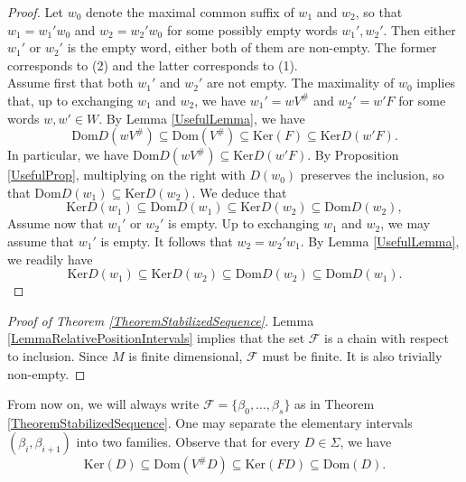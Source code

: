 \documentclass[12pt]{amsart}
\theoremstyle{definition}
\newcommand{\<}{\langle}   %
\renewcommand{\>}{\rangle} %
\begin{document}
\begin{proof}
    Let $w_0$ denote the maximal common suffix of $w_1$ and $w_2$, so that $w_1 = w_1'w_0$ and $w_2 = w_2'w_0$ for some possibly empty words $w_1',w_2'$. Then either $w_1'$ or $w_2'$ is the empty word, either both of them are non-empty. The former corresponds to (2) and the latter corresponds to (1).\\
    Assume first that both $w_1'$ and $w_2'$ are not empty. The maximality of $w_0$ implies that, up to exchanging $w_1$ and $w_2$, we have $w_1' = wV^{\#}$ and $w_2' = w'F$ for some words $w,w' \in W$. By Lemma \ref{UsefulLemma}, we have
    \begin{equation*}
        \mathrm{Dom}D(wV^{\#}) \subseteq  \mathrm{Dom}(V^{\#}) \subseteq  \mathrm{Ker}(F) \subseteq  \mathrm{Ker}D(w'F).
    \end{equation*}
    In particular, we have $\mathrm{Dom}D(wV^{\#}) \subseteq  \mathrm{Ker}D(w'F)$. By Proposition \ref{UsefulProp}, multiplying on the right with $D(w_0)$ preserves the inclusion, so that $\mathrm{Dom}D(w_1) \subseteq  \mathrm{Ker}D(w_2)$. We deduce that
    \begin{equation*}
        \mathrm{Ker}D(w_1) \subseteq  \mathrm{Dom}D(w_1) \subseteq  \mathrm{Ker}D(w_2) \subseteq  \mathrm{Dom}D(w_2),
    \end{equation*}
    Assume now that $w_1'$ or $w_2'$ is empty. Up to exchanging $w_1$ and $w_2$, we may assume that $w_1'$ is empty. It follows that $w_2 = w_2'w_1$. By Lemma \ref{UsefulLemma}, we readily have
    \begin{equation*}
            \mathrm{Ker}D(w_1) \subseteq  \mathrm{Ker}D(w_2) \subseteq  \mathrm{Dom}D(w_2) \subseteq  \mathrm{Dom}D(w_1).
    \end{equation*}
\end{proof}

\begin{proof}[Proof of Theorem \ref{TheoremStabilizedSequence}]
Lemma \ref{LemmaRelativePositionIntervals} implies that the set $\mathcal F$ is a chain with respect to inclusion. Since $M$ is finite dimensional, $\mathcal F$ must be finite. It is also trivially non-empty.
\end{proof}

From now on, we will always write $\mathcal F = \{\beta_0,\ldots , \beta_s\}$ as in Theorem \ref{TheoremStabilizedSequence}. One may separate the elementary intervals $(\beta_i,\beta_{i+1})$ into two families. Observe that for every $D \in \Sigma$, we have
\begin{equation}\label{CompletionInterval}
\mathrm{Ker}(D) \subseteq  \mathrm{Dom}(V^{\#}D) \subseteq  \mathrm{Ker}(FD) \subseteq  \mathrm{Dom}(D).
\end{equation}
\end{document}
